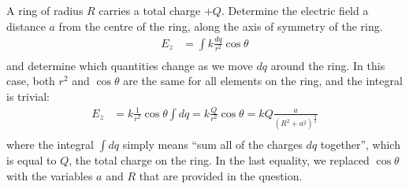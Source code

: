 \begin{example}{\label{ex:chargesfields:ring}A ring of radius $R$ carries a total charge $+Q$. Determine the electric field a distance $a$ from the centre of the ring, along the axis of symmetry of the ring.}
\begin{align*}
E_z &= \int k\frac{dq}{r^2}\cos\theta \\
\end{align*}
and determine which quantities change as we move $dq$ around the ring. In this case, both $r^2$ and $\cos\theta$ are the same for all elements on the ring, and the integral is trivial:
\begin{align*}
E_z &= k\frac{1}{r^2}\cos\theta\int dq=k\frac{Q}{r^2}\cos\theta=kQ\frac{a}{(R^2+a^2)^\frac{3}{2}}  \\
\end{align*}
where the integral $\int dq$ simply means ``sum all of the charges $dq$ together'', which is equal to $Q$, the total charge on the ring. 
In the last equality, we replaced $\cos\theta$ with the variables $a$ and $R$ that are provided in the question.
\end{example}


